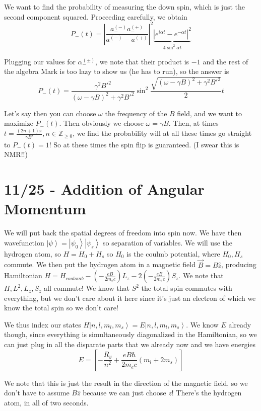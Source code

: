 \documentclass[10pt]{report}
\newcommand{\ket}[1]{\left|#1\right>}
\newcommand{\abs}[1]{\left|#1\right|}
\begin{document}
We want to find the probability of measuring the down spin, which is just the second component squared. Proceeding carefully, we obtain
$$P_-(t) = \abs{\frac{a^{(-)}_-a^{(+)}_-}{a^{(-)}_- - a^{(+)}_-}}^2\underbrace{\abs{e^{i\alpha t} - e^{-\alpha t}}^2}_{4\sin^2 \alpha t}$$

Plugging our values for $\alpha^{(\pm)}_-$, we note that their product is $-1$ and the rest of the algebra Mark is too lazy to show us (he has to run), so the answer is
$$P_-(t) = \frac{\gamma^2 B'^2}{(\omega-\gamma B)^2 + \gamma^2 B'^2}\sin^2 \frac{\sqrt{(\omega - \gamma B)^2 + \gamma^2 B'^2}}{2} t$$

Let's say then you can choose $\omega$ the frequency of the $B$ field, and we want to maximize $P_-(t)$. Then obviously we choose $\omega = \gamma B$. Then, at times $t = \frac{(2n+1)\pi}{\gamma B'}, n \in \mathbb{Z}_{\geq 0}$, we find the probability will at all these times go straight to $P_-(t) = 1$! So at these times the spin flip is guaranteed. (I swear this is NMR!!)

\chapter{11/25 - Addition of Angular Momentum}

We will put back the spatial degrees of freedom into spin now. We have then wavefunction $\ket{\psi} = \ket{\psi_0}\ket{\psi_s}$ so separation of variables. We will use the hydrogen atom, so $H = H_0 + H_s$ so $H_0$ is the coulmb potential, where $H_0, H_s$ commute. We then put the hydrogen atom in a magnetic field $\vec{B} = B\hat{z}$, producing Hamiltonian $H = H_{coulomb} - \left( -\frac{eB}{2m_e c} \right)L_z - 2\left( -\frac{eB}{2m_e c} \right)S_z$. We note that $H, L^2, L_z, S_z$ all commute! We know that $S^2$ the total spin commutes with everything, but we don't care about it here since it's just an electron of which we know the total spin so we don't care!

We thus index our states $H \ket{n,l,m_l, m_s} = E\ket{n,l,m_l, m_s}$. We know $E$ already though, since everything is simultaneously diagonalized in the Hamiltonian, so we can just plug in all the disparate parts that we already now and we have energies
$$E = \left[ -\frac{R_y}{n^2} + \frac{eB\hbar}{2m_e c}(m_l + 2m_s)\right]$$

We note that this is just the result in the direction of the magnetic field, so we don't have to assume $B\hat{z}$ because we can just choose $z$! There's the hydrogen atom, in all of two seconds. 
\end{document}
